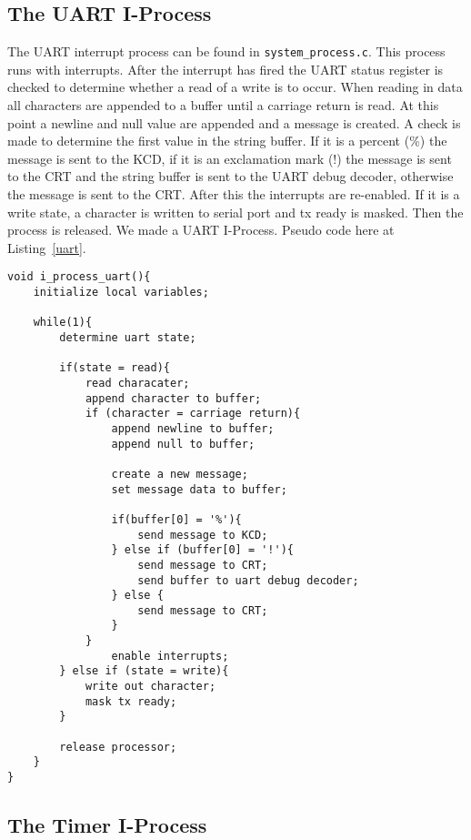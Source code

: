 \documentclass[oneside]{article}
\begin{document}
\subsection*{The UART I-Process}
The UART interrupt process can be found in \texttt{system\_process.c}. This process runs with 
interrupts. After the interrupt has fired the UART status register is checked to 
determine whether a read of a write is to occur. When reading in data all characters are appended 
to a buffer until a carriage return is read. At this point a newline and null value are appended 
and a message is created. A check is made to determine the first value in the string buffer. If 
it is a percent (\%) the message is sent to the KCD, if it is an exclamation mark (!) the message 
is sent to the CRT and the string buffer is sent to the UART debug decoder, otherwise the message 
is sent to the CRT. After this the interrupts are re-enabled. If it is a write state, a character is 
written to serial port and tx ready is masked. Then the process is released.
We made a UART I-Process. Pseudo code here at Listing~\ref{uart}.

\begin{lstlisting}
void i_process_uart(){
    initialize local variables;

    while(1){
        determine uart state;

        if(state = read){
            read characater;
            append character to buffer;
            if (character = carriage return){
                append newline to buffer;
                append null to buffer;
                
                create a new message;
                set message data to buffer;

                if(buffer[0] = '%'){
                    send message to KCD;                
                } else if (buffer[0] = '!'){
                    send message to CRT;
                    send buffer to uart debug decoder;
                } else {
                    send message to CRT;
                }
            }
                enable interrupts;
        } else if (state = write){
            write out character;
            mask tx ready;
        }
    
        release processor;
    }
}
\end{lstlisting}

\subsection*{The Timer I-Process}
\end{document}
